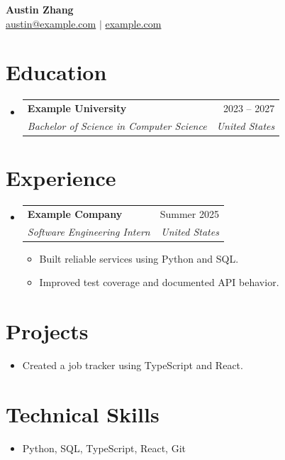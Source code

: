 \documentclass[letterpaper,11pt]{article}
\makeatletter
\newcommand{\resumeItem}[1]{\item\small{#1\vspace{-2pt}}}
\newcommand{\resumeSubheading}[4]{\item\begin{tabular*}{0.97\textwidth}[t]{l@{\extracolsep{\fill}}r}\textbf{#1} & #2 \\ \textit{\small#3} & \textit{\small#4} \\\end{tabular*}\vspace{-7pt}}
\makeatother
\begin{document}
\begin{center}
  \textbf{\Huge Austin Zhang} \\ \small
  \href{mailto:austin@example.com}{austin@example.com} $|$
  \href{https://example.com}{example.com}
\end{center}
\section{Education}
\begin{itemize}[leftmargin=0.15in,label={}]
  \resumeSubheading{Example University}{2023 -- 2027}{Bachelor of Science in Computer Science}{United States}
\end{itemize}
\section{Experience}
\begin{itemize}[leftmargin=0.15in,label={}]
  \resumeSubheading{Example Company}{Summer 2025}{Software Engineering Intern}{United States}
  \begin{itemize}
    \resumeItem{Built reliable services using Python and SQL.}
    \resumeItem{Improved test coverage and documented API behavior.}
  \end{itemize}
\end{itemize}
\section{Projects}
\begin{itemize}
  \resumeItem{Created a job tracker using TypeScript and React.}
\end{itemize}
\section{Technical Skills}
\begin{itemize}[leftmargin=0.15in,label={}]
  \item \small{Python, SQL, TypeScript, React, Git}
\end{itemize}
\end{document}
